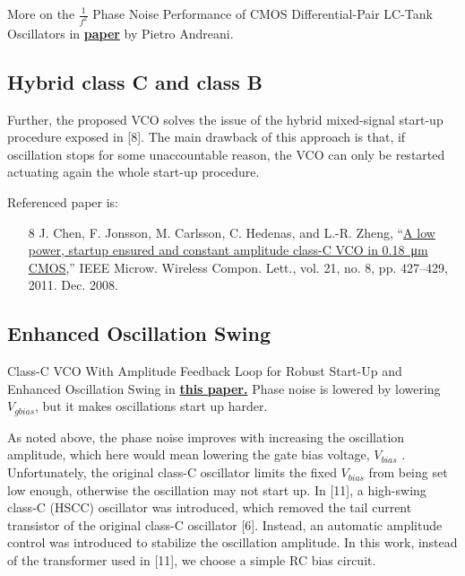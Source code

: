 \documentclass{article}
\begin{document}
More on the $\frac{1}{f^2}$ Phase Noise Performance of CMOS Differential-Pair LC-Tank Oscillators in \href{https://backend.orbit.dtu.dk/ws/files/3913656/Andreani.pdf}{\textbf{paper}} by Pietro Andreani.


\subsection{Hybrid class C and class B}

\begin{info}
Further, the proposed VCO solves the issue of the hybrid mixed-signal start-up procedure exposed in [8]. The main drawback of this approach is that, if oscillation stops for some unaccountable reason, the VCO can only be restarted actuating again the whole start-up procedure.
\end{info}

Referenced paper is:

\begin{itemize}
	\item [8] J. Chen, F. Jonsson, M. Carlsson, C. Hedenas, and L.-R. Zheng, “\href{https://ieeexplore.ieee.org/document/5951800}{A low power, startup ensured and constant amplitude class-C VCO in \SI{0.18}{\micro\metre} CMOS},” IEEE Microw. Wireless Compon. Lett., vol. 21, no. 8, pp. 427–429, 2011. Dec. 2008.
\end{itemize}


\subsection{Enhanced Oscillation Swing}

Class-C VCO With Amplitude Feedback Loop for Robust Start-Up and Enhanced Oscillation Swing in \href{https://ieeexplore.ieee.org/stamp/stamp.jsp?arnumber=6377236}{\textbf{this paper.}} Phase noise is lowered by lowering $V_{gbias}$, but it makes oscillations start up harder.

\begin{info}
As noted above, the phase noise improves with increasing the oscillation amplitude, which here would mean lowering the gate bias voltage, $V_{bias}$ . Unfortunately, the original class-C oscillator limits the fixed $V_{bias}$ from being set low enough, otherwise the oscillation may not start up. In [11], a high-swing class-C (HSCC) oscillator was introduced, which removed the tail current transistor of the original class-C oscillator [6]. Instead, an automatic amplitude control was introduced to stabilize the oscillation amplitude. In this work, instead of the transformer used in [11], we choose a simple RC bias circuit.
\end{info}
\end{document}
